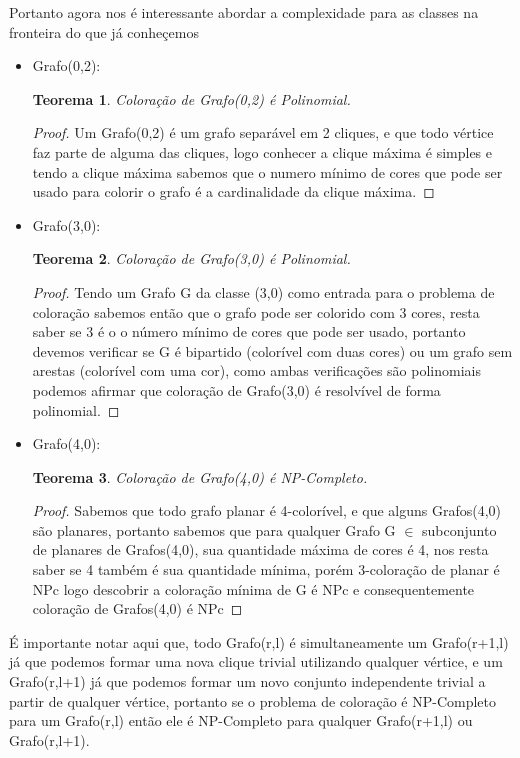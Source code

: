 \documentclass[
	12pt,				%
	openright,			%
	oneside,			%
	a4paper,			%
	english,			%
	french,				%
	spanish,			%
	brazil				%
	]{abntex2}
\newtheorem{teorema}{Teorema}
\begin{document}
Portanto agora nos é interessante abordar a complexidade para as classes na fronteira do que já conheçemos
\begin{itemize}
  \item Grafo(0,2):
     \begin{teorema}
        Coloração de Grafo(0,2) é Polinomial.
     \end{teorema}
     \begin{proof}
      Um Grafo(0,2) é um grafo separável em 2 cliques, e que todo vértice faz parte de alguma das cliques, logo conhecer a clique máxima é simples e tendo a clique máxima sabemos que o numero mínimo de cores que pode ser usado para colorir o grafo é a cardinalidade da clique máxima.
     \end{proof}
  \item Grafo(3,0):
     \begin{teorema}
        Coloração de Grafo(3,0) é Polinomial.
     \end{teorema}
     \begin{proof}
      Tendo um Grafo G da classe (3,0) como entrada para o problema de coloração sabemos então que o grafo pode ser colorido com 3 cores, resta saber se 3 é o o número mínimo de cores que pode ser usado, portanto devemos verificar se G é bipartido (colorível com duas cores) ou um grafo sem arestas (colorível com uma cor), como ambas verificações são polinomiais podemos afirmar que coloração de Grafo(3,0) é resolvível de forma polinomial.
     \end{proof}
  \item Grafo(4,0):
      \begin{teorema}
        Coloração de Grafo(4,0) é NP-Completo.
      \end{teorema}
      \begin{proof}
        Sabemos que todo grafo planar é 4-colorível, e que alguns Grafos(4,0) são planares, portanto sabemos que para qualquer Grafo G $\in$ subconjunto de planares de Grafos(4,0), sua quantidade máxima de cores é 4, nos resta saber se 4 também é sua quantidade mínima, porém 3-coloração de planar é NPc logo descobrir a coloração mínima de G é NPc e consequentemente coloração de Grafos(4,0) é NPc
      \end{proof}
\end{itemize}

É importante notar aqui que, todo Grafo(r,l) é simultaneamente um Grafo(r+1,l) já que podemos formar uma nova clique trivial utilizando qualquer vértice, e um Grafo(r,l+1) já que podemos formar um novo conjunto independente trivial a partir de qualquer vértice, portanto se o problema de coloração é NP-Completo para um Grafo(r,l) então ele é NP-Completo para qualquer Grafo(r+1,l) ou Grafo(r,l+1).
\end{document}
